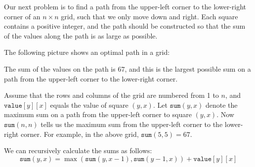 Our next problem is to find a path
from the upper-left corner to
the lower-right corner
of an $n \times n$ grid, such that
we only move down and right.
Each square contains a positive integer,
and the path should be constructed so
that the sum of the values along
the path is as large as possible.

The following picture shows an optimal
path in a grid:
\begin{center}
\end{center}
The sum of the values on the path is 67,
and this is the largest possible sum on a path
from the
upper-left corner to the lower-right corner.

Assume that the rows and columns of the
grid are numbered from 1 to $n$,
and $\texttt{value}[y][x]$ equals the value
of square $(y,x)$.
Let $\texttt{sum}(y,x)$ denote the maximum
sum on a path from the upper-left corner
to square $(y,x)$.
Now $\texttt{sum}(n,n)$ tells us
the maximum sum
from the upper-left corner to
the lower-right corner.
For example, in the above grid,
$\texttt{sum}(5,5)=67$.

We can recursively calculate the sums
as follows:
\[ \texttt{sum}(y,x) = \max(\texttt{sum}(y,x-1),\texttt{sum}(y-1,x))+\texttt{value}[y][x]\]



